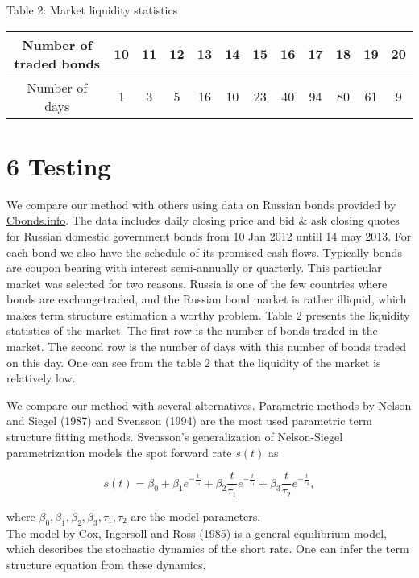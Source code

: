 \documentclass[10pt]{article}
\begin{document}
Table 2: Market liquidity statistics

\begin{center}
\begin{tabular}{|c|ccccccccccc|}
\hline
Number of traded bonds & 10 & 11 & 12 & 13 & 14 & 15 & 16 & 17 & 18 & 19 & 20 \\
\hline
Number of days & 1 & 3 & 5 & 16 & 10 & 23 & 40 & 94 & 80 & 61 & 9 \\
\hline
\end{tabular}
\end{center}

\section*{6 Testing}
We compare our method with others using data on Russian bonds provided by \href{http://Cbonds.info}{Cbonds.info}. The data includes daily closing price and bid \& ask closing quotes for Russian domestic government bonds from 10 Jan 2012 untill 14 may 2013. For each bond we also have the schedule of its promised cash flows. Typically bonds are coupon bearing with interest semi-annually or quarterly. This particular market was selected for two reasons. Russia is one of the few countries where bonds are exchangetraded, and the Russian bond market is rather illiquid, which makes term structure estimation a worthy problem. Table 2 presents the liquidity statistics of the market. The first row is the number of bonds traded in the market. The second row is the number of days with this number of bonds traded on this day. One can see from the table 2 that the liquidity of the market is relatively low.

We compare our method with several alternatives. Parametric methods by Nelson and Siegel (1987) and Svensson (1994) are the most used parametric term structure fitting methods. Svensson's generalization of Nelson-Siegel parametrization models the spot forward rate $s(t)$ as

$$
s(t)=\beta_{0}+\beta_{1} e^{-\frac{t}{\tau_{1}}}+\beta_{2} \frac{t}{\tau_{1}} e^{-\frac{t}{\tau_{1}}}+\beta_{3} \frac{t}{\tau_{2}} e^{-\frac{t}{\tau_{2}}},
$$

where $\beta_{0}, \beta_{1}, \beta_{2}, \beta_{3}, \tau_{1}, \tau_{2}$ are the model parameters.\\
The model by Cox, Ingersoll and Ross (1985) is a general equilibrium model, which describes the stochastic dynamics of the short rate. One can infer the term structure equation from these dynamics.
\end{document}
